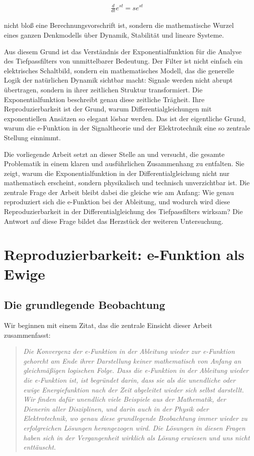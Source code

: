 \documentclass[a4paper,12pt,twoside]{report}
\theoremstyle{definition}
\begin{document}
\begin{align}
    \frac{d}{dt} e^{st} = s e^{st}
\end{align}

nicht bloß eine Berechnungsvorschrift ist, sondern die mathematische Wurzel eines ganzen Denkmodells über Dynamik, Stabilität und lineare Systeme.

Aus diesem Grund ist das Verständnis der Exponentialfunktion für die Analyse des Tiefpassfilters von unmittelbarer Bedeutung. Der Filter ist nicht einfach ein elektrisches Schaltbild, sondern ein mathematisches Modell, das die generelle Logik der natürlichen Dynamik sichtbar macht: Signale werden nicht abrupt übertragen, sondern in ihrer zeitlichen Struktur transformiert. Die Exponentialfunktion beschreibt genau diese zeitliche Trägheit. Ihre Reproduzierbarkeit ist der Grund, warum Differentialgleichungen mit exponentiellen Ansätzen so elegant lösbar werden. Das ist der eigentliche Grund, warum die e-Funktion in der Signaltheorie und der Elektrotechnik eine so zentrale Stellung einnimmt.

Die vorliegende Arbeit setzt an dieser Stelle an und versucht, die gesamte Problematik in einem klaren und ausführlichen Zusammenhang zu entfalten. Sie zeigt, warum die Exponentialfunktion in der Differentialgleichung nicht nur mathematisch erscheint, sondern physikalisch und technisch unverzichtbar ist. Die zentrale Frage der Arbeit bleibt dabei die gleiche wie am Anfang: Wie genau reproduziert sich die e-Funktion bei der Ableitung, und wodurch wird diese Reproduzierbarkeit in der Differentialgleichung des Tiefpassfilters wirksam? Die Antwort auf diese Frage bildet das Herzstück der weiteren Untersuchung.
\section{Reproduzierbarkeit: e-Funktion als Ewige}

\subsection{Die grundlegende Beobachtung}

Wir beginnen mit einem Zitat, das die zentrale Einsicht dieser Arbeit zusammenfasst:

\begin{quote}
\textit{Die Konvergenz der e-Funktion in der Ableitung wieder zur e-Funktion gehorcht am Ende ihrer Darstellung keiner mathematisch von Anfang an gleichmäßigen logischen Folge. Dass die e-Funktion in der Ableitung wieder die e-Funktion ist, ist begründet darin, dass sie als die unendliche oder ewige Energiefunktion nach der Zeit abgeleitet wieder sich selbst darstellt. Wir finden dafür unendlich viele Beispiele aus der Mathematik, der Dienerin aller Disziplinen, und darin auch in der Physik oder Elektrotechnik, wo genau diese grundlegende Beobachtung immer wieder zu erfolgreichen Lösungen herangezogen wird. Die Lösungen in diesen Fragen haben sich in der Vergangenheit wirklich als Lösung erwiesen und uns nicht enttäuscht.}
\end{quote}
\end{document}
